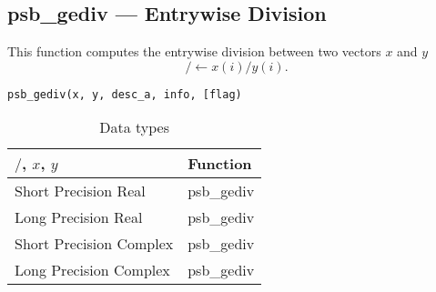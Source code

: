\clearpage\subsection{psb\_gediv --- Entrywise Division}

This function computes the entrywise division between two vectors $x$ and
$y$
\[/ \leftarrow x(i)/y(i).\]

\begin{verbatim}
psb_gediv(x, y, desc_a, info, [flag)
\end{verbatim}
\begin{table}[h]
	\begin{center}
		\begin{tabular}{ll}
			\hline
			$/$, $x$, $y$ & {\bf Function}\\
			\hline
			Short Precision Real & psb\_gediv \\
			Long Precision Real & psb\_gediv \\
			Short Precision Complex & psb\_gediv \\	
			Long Precision Complex & psb\_gediv \\	
			\hline
		\end{tabular}
	\end{center}
	\caption{Data types\label{tab:f90div}}
\end{table}

